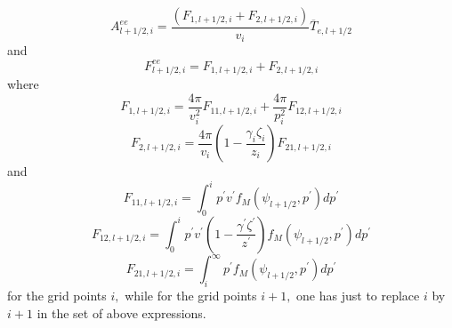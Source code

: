 \begin{equation}
A_{l+1/2,i}^{ee}=\frac{\left( F_{1,l+1/2,i}+F_{2,l+1/2,i}\right) }{v_{i}}%
\overline{T}_{e,l+1/2}
\end{equation}
and
\begin{equation}
F_{l+1/2,i}^{ee}=F_{1,l+1/2,i}+F_{2,l+1/2,i}
\end{equation}
where
\begin{equation}
F_{1,l+1/2,i}=\frac{4\pi }{v_{i}^{2}}F_{11,l+1/2,i}+\frac{4\pi }{p_{i}^{2}}%
F_{12,l+1/2,i}
\end{equation}
\begin{equation}
F_{2,l+1/2,i}=\frac{4\pi }{v_{i}}\left( 1-\frac{\gamma _{i}\zeta _{i}}{z_{i}}%
\right) F_{21,l+1/2,i}
\end{equation}
and
\begin{equation}
F_{11,l+1/2,i}=\int_{0}^{i}p^{\prime }v^{\prime }f_{M}\left( \psi
_{l+1/2},p^{\prime }\right) dp^{\prime }
\end{equation}
\begin{equation}
F_{12,l+1/2,i}=\int_{0}^{i}p^{\prime }v^{\prime }\left( 1-\frac{\gamma
^{\prime }\zeta ^{\prime }}{z^{\prime }}\right) f_{M}\left( \psi
_{l+1/2},p^{\prime }\right) dp^{\prime }
\end{equation}
\begin{equation}
F_{21,l+1/2,i}=\int_{i}^{\infty }p^{\prime }f_{M}\left( \psi
_{l+1/2},p^{\prime }\right) dp^{\prime }
\end{equation}
for the grid points $i,$ while for the grid points $i+1,$ one has just to
replace $i$ by $i+1$ in the set of above expressions.


